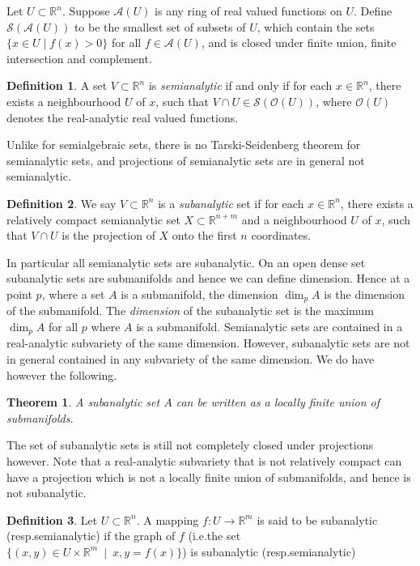 \documentclass[12pt]{article}
\theoremstyle{theorem}
\newtheorem*{thm}{Theorem}
\theoremstyle{definition}
\newtheorem*{defn}{Definition}
\theoremstyle{remark}
\begin{document}
Let $U \subset {\mathbb{R}}^n$.
Suppose $\mathcal{A}(U)$ is any ring of real valued functions on
$U$.
Define $\mathcal{S}(\mathcal{A}(U))$ to be the smallest
set of subsets of $U$, which contain the sets
$\{ x\in U \mid f(x) > 0 \}$ for all $f \in \mathcal{A}(U)$,
and is closed under finite union, finite intersection and complement.

\begin{defn}
A set $V \subset {\mathbb{R}}^n$ is {\em semianalytic}
if and only if for each $x \in {\mathbb{R}}^n$, there exists a neighbourhood
$U$ of $x$, such that $V \cap U \in \mathcal{S}(\mathcal{O}(U))$, where $\mathcal{O}(U)$
denotes the real-analytic real valued functions.
\end{defn}

Unlike for semialgebraic sets, there is no Tarski-Seidenberg theorem for semianalytic sets, and projections of semianalytic sets are in general not semianalytic.

\begin{defn}
We say
$V \subset {\mathbb{R}}^n$ is a {\em subanalytic} set if for
each $x \in {\mathbb{R}}^n$, there exists a relatively compact semianalytic set
$X \subset {\mathbb{R}}^{n+m}$ and a neighbourhood $U$ of $x$, such that
$V \cap U$ is the projection of $X$ onto the first $n$ coordinates.
\end{defn}

In particular all semianalytic sets are subanalytic.
On an open dense set
subanalytic sets are submanifolds and hence we
can define dimension.  Hence at a point $p$, where a set $A$ is a submanifold,
the dimension $\dim_p A$ is the dimension of the submanifold.  The {\em dimension} of the subanalytic set is the maximum $\dim_p A$ for all
$p$ where $A$ is a submanifold.
Semianalytic sets are contained in a real-analytic subvariety of the same dimension.  However, subanalytic sets are not in general
contained in any subvariety of the same dimension.  We do have however the
following.

\begin{thm}
A subanalytic set $A$ can be written as a locally finite union of
submanifolds.
\end{thm}

The set of subanalytic sets is still not completely closed under projections however.  Note that
a real-analytic subvariety that is not relatively compact can have a
projection which is not a locally finite union of submanifolds, and hence
is not subanalytic.

\begin{defn}
Let $U \subset {\mathbb{R}}^n$.  A mapping $f \colon U \to {\mathbb{R}}^m$ is said to be subanalytic (resp.\@ semianalytic)
if the graph of $f$ (i.e.\@ the set $\{ (x,y) \in U \times {\mathbb{R}}^m ~\mid~
x, y=f(x) \}$) is subanalytic (resp.\@ semianalytic)
\end{defn}
\end{document}
